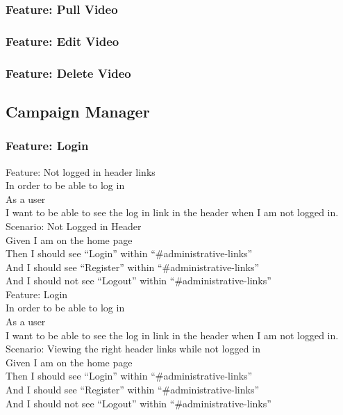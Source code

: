 \documentclass[12pt]{article}
\begin{document}
\subsubsection{Feature: Pull Video}
\subsubsection{Feature: Edit Video}
\subsubsection{Feature: Delete Video}

\subsection{Campaign Manager}

\subsubsection{Feature: Login}

Feature: Not logged in header links \\
In order to be able to log in \\
As a user \\
I want to be able to see the log in link in the header when I am not logged in. \\

Scenario: Not Logged in Header  \\
Given I am on the home page \\
Then I should see ``Login'' within ``\#administrative-links'' \\
And I should see ``Register'' within ``\#administrative-links'' \\
And I should not see ``Logout'' within ``\#administrative-links'' \\

Feature: Login \\
  In order to be able to log in \\
  As a user \\
  I want to be able to see the log in link in the header when I am not logged in. \\

Scenario: Viewing the right header links while not logged in  \\
  Given I am on the home page \\
  Then I should see ``Login'' within ``\#administrative-links'' \\
  And I should see ``Register'' within ``\#administrative-links'' \\
  And I should not see ``Logout'' within ``\#administrative-links'' \\
\end{document}
